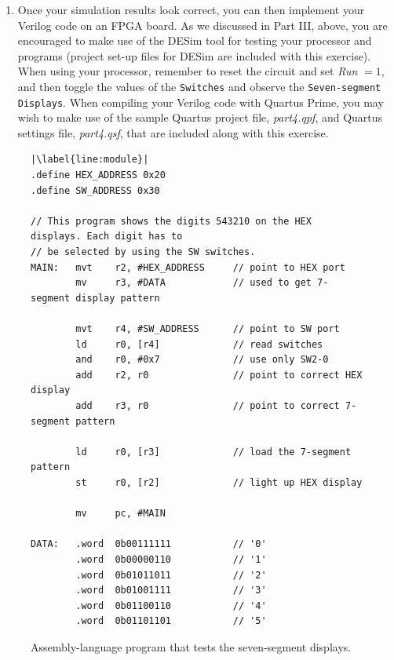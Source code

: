 \documentclass[epsfig,10pt,fullpage]{article} \addtolength{\textwidth}{1.5in}
\begin{document}
\begin{enumerate}
\item Once your simulation results look correct, you can then implement your Verilog
code on an FPGA board. As we discussed in Part III, above, you are encouraged 
to make use of the DESim tool for testing your processor and
programs (project set-up files for DESim are included with this exercise). 
When using your processor, remember to reset the circuit and set {\it Run} $= 1$, and then 
toggle the values of the \texttt{Switches} and 
observe the \texttt{Seven-segment Displays}. When compiling your Verilog code with
Quartus Prime, you may wish to make use of the sample Quartus project file, {\it part4.qpf}, 
and Quartus settings file, {\it part4.qsf}, that are included along with this exercise.
\end{enumerate}

\lstset{language=ASM,numbers=none,escapechar=|}
\begin{figure}[H]
\begin{center}
\begin{minipage}[h]{15 cm}
\begin{lstlisting}[name=proc]
|\label{line:module}|
.define HEX_ADDRESS 0x20
.define SW_ADDRESS 0x30

// This program shows the digits 543210 on the HEX displays. Each digit has to
// be selected by using the SW switches.
MAIN:   mvt    r2, #HEX_ADDRESS     // point to HEX port
        mv     r3, #DATA            // used to get 7-segment display pattern

        mvt    r4, #SW_ADDRESS      // point to SW port
        ld     r0, [r4]             // read switches
        and    r0, #0x7             // use only SW2-0
        add    r2, r0               // point to correct HEX display
        add    r3, r0               // point to correct 7-segment pattern

        ld     r0, [r3]             // load the 7-segment pattern
        st     r0, [r2]             // light up HEX display

        mv     pc, #MAIN

DATA:   .word  0b00111111           // '0'
        .word  0b00000110           // '1'
        .word  0b01011011           // '2'
        .word  0b01001111           // '3'
        .word  0b01100110           // '4'
        .word  0b01101101           // '5'
\end{lstlisting}
\end{minipage}
\caption{Assembly-language program that tests the seven-segment displays.}
\label{fig:7segs}
\end{center}
\end{figure}
\end{document}
